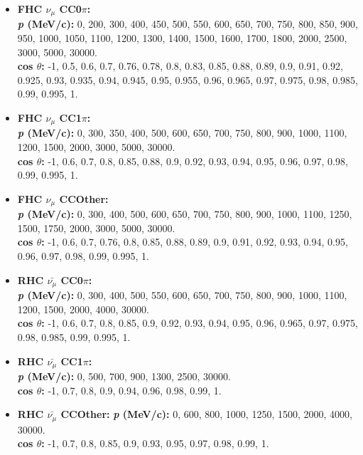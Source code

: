 \begin{itemize}

\item \textbf{FHC $\nu_{\mu}$ CC0$\pi$:}\\
\textbf{\textit{p} (MeV/c):} 0, 200, 300, 400, 450, 500, 550, 600, 650, 700, 750, 800, 850, 900, 950, 1000, 1050, 1100, 1200, 1300, 1400, 1500, 1600, 1700, 1800, 2000, 2500, 3000, 5000, 30000.\\
\textbf{cos $\theta$:} -1, 0.5, 0.6, 0.7, 0.76, 0.78, 0.8, 0.83, 0.85, 0.88, 0.89, 0.9, 0.91, 0.92, 0.925, 0.93, 0.935, 0.94, 0.945, 0.95, 0.955, 0.96, 0.965, 0.97, 0.975, 0.98, 0.985, 0.99, 0.995, 1.

\item \textbf{FHC $\nu_{\mu}$ CC1$\pi$:}\\
\textbf{\textit{p} (MeV/c):} 0, 300, 350, 400, 500, 600, 650, 700, 750, 800, 900, 1000, 1100, 1200, 1500, 2000, 3000, 5000, 30000.\\
\textbf{cos $\theta$:} -1, 0.6, 0.7, 0.8, 0.85, 0.88, 0.9, 0.92, 0.93, 0.94, 0.95, 0.96, 0.97, 0.98, 0.99, 0.995, 1.

\item \textbf{FHC $\nu_{\mu}$ CCOther:}\\
\textbf{\textit{p} (MeV/c):} 0, 300, 400, 500, 600, 650, 700, 750, 800, 900, 1000, 1100, 1250, 1500, 1750, 2000, 3000, 5000, 30000.\\
\textbf{cos $\theta$:} -1, 0.6, 0.7, 0.76, 0.8, 0.85, 0.88, 0.89, 0.9, 0.91, 0.92, 0.93, 0.94, 0.95, 0.96, 0.97, 0.98, 0.99, 0.995, 1.

\item \textbf{RHC $\bar{\nu_{\mu}}$ CC0$\pi$:}\\
\textbf{\textit{p} (MeV/c):} 0, 300, 400, 500, 550, 600, 650, 700, 750, 800, 900, 1000, 1100, 1200, 1500, 2000, 4000, 30000.\\
\textbf{cos $\theta$:} -1, 0.6, 0.7, 0.8, 0.85, 0.9, 0.92, 0.93, 0.94, 0.95, 0.96, 0.965, 0.97, 0.975, 0.98, 0.985, 0.99, 0.995, 1.

\item \textbf{RHC $\bar{\nu_{\mu}}$ CC1$\pi$:}\\
\textbf{\textit{p} (MeV/c):} 0, 500, 700, 900, 1300, 2500, 30000.\\
\textbf{cos $\theta$:}  -1, 0.7, 0.8, 0.9, 0.94, 0.96, 0.98, 0.99, 1.

\item \textbf{RHC $\bar{\nu_{\mu}}$ CCOther:}
\textbf{\textit{p} (MeV/c):} 0, 600, 800, 1000, 1250, 1500, 2000, 4000, 30000.\\
\textbf{cos $\theta$:} -1, 0.7, 0.8, 0.85, 0.9, 0.93, 0.95, 0.97, 0.98, 0.99, 1.


\end{itemize}

